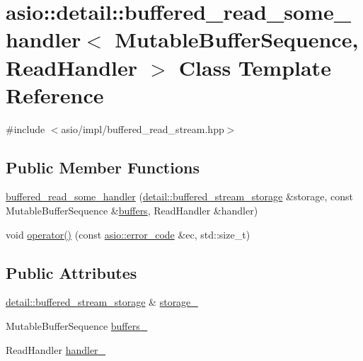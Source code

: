 \hypertarget{classasio_1_1detail_1_1buffered__read__some__handler}{}\section{asio\+:\+:detail\+:\+:buffered\+\_\+read\+\_\+some\+\_\+handler$<$ Mutable\+Buffer\+Sequence, Read\+Handler $>$ Class Template Reference}
\label{classasio_1_1detail_1_1buffered__read__some__handler}


{\ttfamily \#include $<$asio/impl/buffered\+\_\+read\+\_\+stream.\+hpp$>$}

\subsection*{Public Member Functions}
\begin{DoxyCompactItemize}
\item 
\hyperlink{classasio_1_1detail_1_1buffered__read__some__handler_a38463f5bfc2f7ecc4969a290c05cb7b3}{buffered\+\_\+read\+\_\+some\+\_\+handler} (\hyperlink{classasio_1_1detail_1_1buffered__stream__storage}{detail\+::buffered\+\_\+stream\+\_\+storage} \&storage, const Mutable\+Buffer\+Sequence \&\hyperlink{group__async__read_ga54dede45c3175148a77fe6635222c47d}{buffers}, Read\+Handler \&handler)
\item 
void \hyperlink{classasio_1_1detail_1_1buffered__read__some__handler_a38590d40af619637df4b45b9d34295e6}{operator()} (const \hyperlink{classasio_1_1error__code}{asio\+::error\+\_\+code} \&ec, std\+::size\+\_\+t)
\end{DoxyCompactItemize}
\subsection*{Public Attributes}
\begin{DoxyCompactItemize}
\item 
\hyperlink{classasio_1_1detail_1_1buffered__stream__storage}{detail\+::buffered\+\_\+stream\+\_\+storage} \& \hyperlink{classasio_1_1detail_1_1buffered__read__some__handler_ae516ae4c7472244010db6e7216e2793a}{storage\+\_\+}
\item 
Mutable\+Buffer\+Sequence \hyperlink{classasio_1_1detail_1_1buffered__read__some__handler_a694096e47a7851ebb94e59145d0247e9}{buffers\+\_\+}
\item 
Read\+Handler \hyperlink{classasio_1_1detail_1_1buffered__read__some__handler_aea902699b5dbf6b5ef4abb29a555cdf7}{handler\+\_\+}
\end{DoxyCompactItemize}


